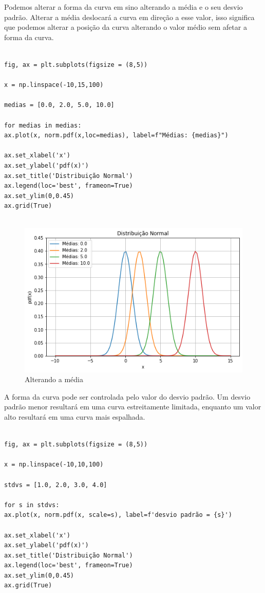 Podemos alterar a forma da curva em sino alterando a média e o seu desvio padrão. Alterar a média deslocará a curva em direção a esse valor, isso significa que podemos alterar a posição da curva alterando o valor médio sem afetar a forma da curva.

\begin{verbatim}
	
fig, ax = plt.subplots(figsize = (8,5))

x = np.linspace(-10,15,100)

medias = [0.0, 2.0, 5.0, 10.0]

for medias in medias:
ax.plot(x, norm.pdf(x,loc=medias), label=f"Médias: {medias}")

ax.set_xlabel('x')
ax.set_ylabel('pdf(x)')
ax.set_title('Distribuição Normal')
ax.legend(loc='best', frameon=True)
ax.set_ylim(0,0.45)
ax.grid(True)
	
\end{verbatim}

\begin{figure}[H]
	\centering
	\includegraphics[width=1\textwidth]{./Imagens/Distribuição Normal/GA3.png} 
	\caption{Alterando a média}
	\label{fig:GA3}
\end{figure}

A forma da curva pode ser controlada pelo valor do desvio padrão. Um desvio padrão menor resultará em uma curva estreitamente limitada, enquanto um valor alto resultará em uma curva mais espalhada. 

\begin{verbatim}
	
fig, ax = plt.subplots(figsize = (8,5))

x = np.linspace(-10,10,100)

stdvs = [1.0, 2.0, 3.0, 4.0]

for s in stdvs:
ax.plot(x, norm.pdf(x, scale=s), label=f'desvio padrão = {s}')

ax.set_xlabel('x')
ax.set_ylabel('pdf(x)')
ax.set_title('Distribuição Normal')
ax.legend(loc='best', frameon=True)
ax.set_ylim(0,0.45)
ax.grid(True)
	
\end{verbatim}

